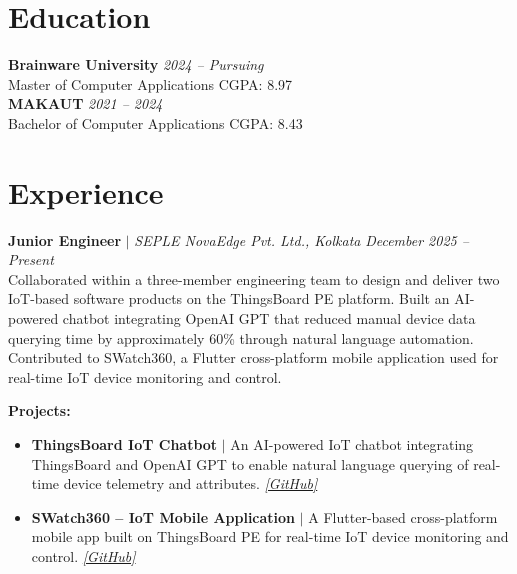 \documentclass[10pt, a4paper]{article}
\begin{document}
\section{Education}
\textbf{Brainware University} \hfill \textit{2024 -- Pursuing} \\
Master of Computer Applications \hfill CGPA: 8.97 \\[4pt]
\textbf{MAKAUT} \hfill \textit{2021 -- 2024} \\
Bachelor of Computer Applications \hfill CGPA: 8.43

\section{Experience}

{\small\textbf{Junior Engineer} $|$ \textit{SEPLE NovaEdge Pvt. Ltd., Kolkata} \hfill \textit{December 2025 -- Present}} \\[2pt]
{\small Collaborated within a three-member engineering team to design and deliver two IoT-based software products on the ThingsBoard PE platform. Built an AI-powered chatbot integrating OpenAI GPT that reduced manual device data querying time by approximately 60\% through natural language automation. Contributed to SWatch360, a Flutter cross-platform mobile application used for real-time IoT device monitoring and control.}

\vspace{4pt}
{\small\textbf{Projects:}}
\begin{itemize}[leftmargin=*, itemsep=1pt, topsep=2pt]
  \item {\small\textbf{ThingsBoard IoT Chatbot} $|$ An AI-powered IoT chatbot integrating ThingsBoard and OpenAI GPT to enable natural language querying of real-time device telemetry and attributes. \href{https://github.com/singhaganesh/ThingsBoard-Bot.git}{\textit{[GitHub]}}}
  \item {\small\textbf{SWatch360 -- IoT Mobile Application} $|$ A Flutter-based cross-platform mobile app built on ThingsBoard PE for real-time IoT device monitoring and control. \href{https://github.com/Itinerant18/SWatch360.git}{\textit{[GitHub]}}}
\end{itemize}
\end{document}
